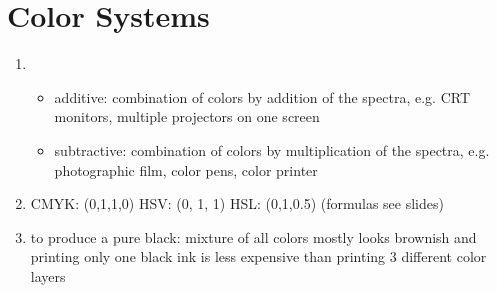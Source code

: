 \documentclass{article}
\begin{document}
\section{Color Systems}
\begin{enumerate}
\item 
\begin{itemize}
\item additive:  combination of colors by addition of the spectra, e.g. CRT monitors, multiple projectors on one screen
\item subtractive: combination of colors by multiplication of the spectra, e.g. photographic film, color pens, color printer
\end{itemize}
\item CMYK: (0,1,1,0) HSV: (0, 1, 1) HSL: (0,1,0.5) (formulas see slides)
\item to produce a pure black: mixture of all colors mostly looks brownish and printing only one black ink is less expensive than printing 3 different color layers
\end{enumerate}
\end{document}
